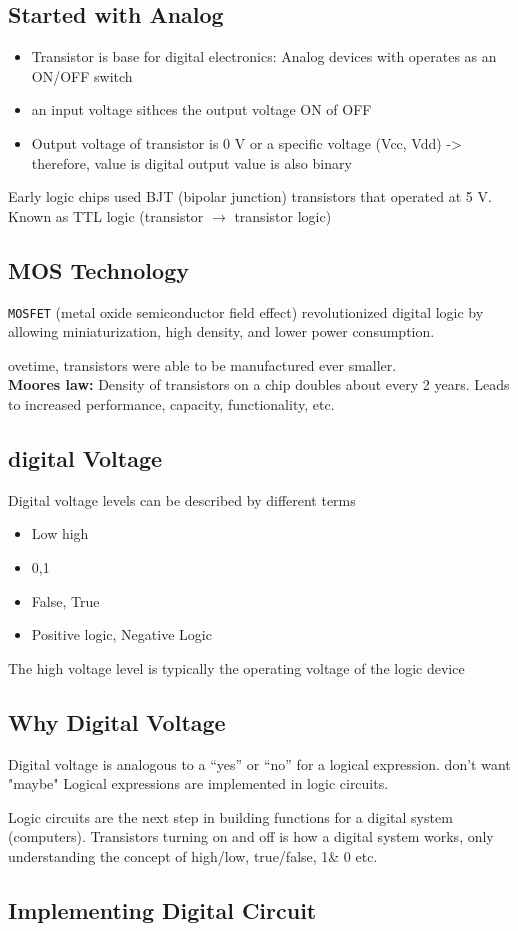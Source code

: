 \documentclass[a4paper, 12pt]{article}
\begin{document}
    \subsection*{Started with Analog}
    \begin{itemize}
        \item Transistor is base for digital electronics: 
        Analog devices with operates
        as an ON/OFF switch
        \item an input voltage sithces the output voltage ON of OFF
        \item Output voltage of transistor is 0 V or a specific voltage (Vcc, Vdd) ->
    therefore, value is digital output value is also binary
    \end{itemize}
    Early logic chips used BJT (bipolar junction) transistors that operated at 5 V. Known as TTL logic (transistor $\rightarrow$ transistor logic)

    \subsection*{MOS Technology}
    \texttt{MOSFET} (metal oxide semiconductor field effect) revolutionized digital logic by
    allowing miniaturization, high density, and lower power consumption.
    \par ovetime, transistors were able to be manufactured ever smaller.\\ \textbf{Moores law:} 
    Density of transistors on a chip doubles about every 2 years. Leads to
    increased performance, capacity, functionality, etc.

    \subsection{digital Voltage}
    Digital voltage levels can be described by different terms
    \begin{itemize}
        \item Low high
        \item 0,1
        \item False, True
        \item Positive logic, Negative Logic
    \end{itemize}
    The high voltage  level is typically the operating voltage of the logic device

    \subsection*{Why Digital Voltage}
    Digital voltage is analogous to a “yes” or “no” for a logical expression. don't want "maybe"
     Logical expressions are implemented in logic circuits.
     \par Logic circuits are the next step in building functions for a digital system (computers).
     Transistors turning on and off is how a digital system works, only understanding the concept 
     of high/low, true/false, 1\& 0 etc.

     \subsection*{Implementing Digital Circuit}
\end{document}
